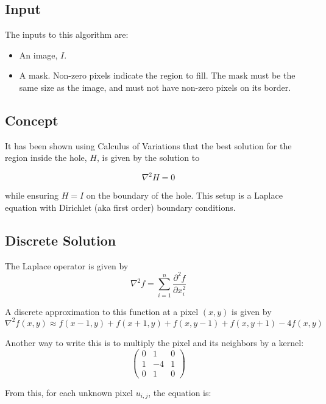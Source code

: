 \documentclass{InsightArticle}
\begin{document}
\subsection{Input}
The inputs to this algorithm are:
\begin{itemize}
\item An image, $I$.
\item A mask. Non-zero pixels indicate the region to fill. The mask must be the same size as the image, and must not have non-zero pixels on its border.
\end{itemize}

\subsection{Concept}
It has been shown using Calculus of Variations that the best solution for the region inside the hole, $H$, is given by the solution to 

\begin{equation}
\nabla^2 H = 0
\end{equation}

while ensuring $H=I$ on the boundary of the hole. This setup is a Laplace equation with Dirichlet (aka first order) boundary conditions. 

\subsection{Discrete Solution}
The Laplace operator is given by
\begin{equation}
 \nabla^2 f = \sum_{i=1}^n \frac{\partial^2 f}{\partial x_i^2}
\end{equation}

A discrete approximation to this function at a pixel $(x,y)$ is given by
\begin{equation}
 \nabla^2 f(x,y) \approx f(x-1,y) + f(x+1,y) + f(x,y-1) + f(x,y+1) - 4f(x,y)
\end{equation}

Another way to write this is to multiply the pixel and its neighbors by a kernel:
\begin{equation}
\begin{pmatrix}
0 & 1 & 0 \\
1 & -4 & 1\\
0 & 1 & 0
\end{pmatrix}
\end{equation}


From this, for each unknown pixel $u_{i,j}$, the equation is:
\end{document}
